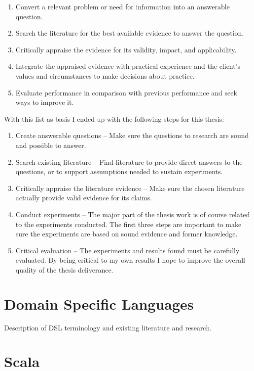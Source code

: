\documentclass[a4paper,english]{report}
\begin{document}
\begin{enumerate}
\item Convert a relevant problem or need for information into an
  answerable question.
\item Search the literature for the best available evidence to answer
  the question.
\item Critically appraise the evidence for its validity, impact, and
  applicability.
\item Integrate the appraised evidence with practical experience and
  the client's values and circumstances to make decisions about
  practice.
\item Evaluate performance in comparison with previous performance and
  seek ways to improve it.
\end{enumerate}

With this list as basis I ended up with the following steps for this
thesis:

\begin{enumerate}
\item Create answerable questions -- Make sure the questions to
  research are sound and possible to answer.
\item Search existing literature -- Find literature to provide direct
  answers to the questions, or to support assumptions needed to
  sustain experiments.
\item Critically appraise the literature evidence -- Make sure the
  chosen literature actually provide valid evidence for its claims.
\item Conduct experiments -- The major part of the thesis work is of
  course related to the experiments conducted. The first three steps
  are important to make sure the experiments are based on sound
  evidence and former knowledge.
\item Critical evaluation -- The experiments and results found must be
  carefully evaluated. By being critical to my own results I hope to
  improve the overall quality of the thesis deliverance.
\end{enumerate}

\chapter{Domain Specific Languages}

Description of DSL terminology and existing literature and research.

\chapter{Scala}
\end{document}

